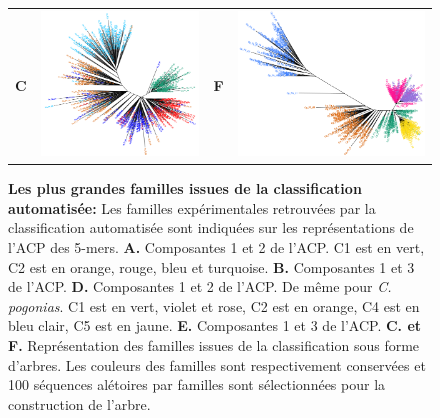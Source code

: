 \documentclass[12pt,a4paper]{article}
\begin{document}
\begin{figure}
\begin{tabular}{cc|cc}
		\textbf{C} & \includegraphics[scale=0.4]{img/tree_solatus.png} & \textbf{F} & \includegraphics[scale=0.35]{img/tree_pogonias.png} \\
	\end{tabular}
	\caption{\textbf{Les plus grandes familles issues de la classification automatisée:} Les familles expérimentales retrouvées par la classification automatisée sont indiquées sur les représentations de l'ACP des 5-mers.
	\textbf{A.} Composantes 1 et 2 de l'ACP. C1 est en vert, C2 est en orange, rouge, bleu et turquoise.  			\textbf{B.} Composantes 1 et 3 de l'ACP. 
	\textbf{D.} Composantes 1 et 2 de l'ACP. De même pour \textit{C. pogonias}. C1 est en vert, violet et rose, C2 est en orange, C4 est en bleu clair, C5 est en jaune.
	\textbf{E.} Composantes 1 et 3 de l'ACP.
	\textbf{C. et F.} Représentation des familles issues de la classification sous forme d'arbres. Les couleurs des familles sont respectivement conservées et 100 séquences alétoires par familles sont sélectionnées pour la construction de l'arbre. 	 
	\label{fig:so_po_acp_tree}
		} 
\end{figure}
			
\end{document}

